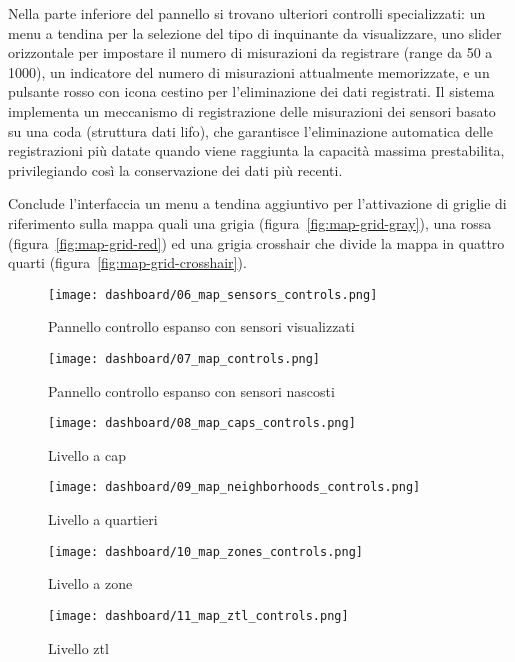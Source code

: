 Nella parte inferiore del pannello si trovano ulteriori controlli specializzati: un menu a tendina per la selezione
del tipo di inquinante da visualizzare, uno slider orizzontale per impostare il numero di misurazioni
da registrare (range da 50 a 1000), un indicatore del numero di misurazioni attualmente memorizzate, e un pulsante
rosso con icona cestino per l'eliminazione dei dati registrati. Il sistema implementa un meccanismo di registrazione
delle misurazioni dei sensori basato su una coda (struttura dati \acrshort{lifo}), che garantisce
l'eliminazione automatica delle registrazioni più datate quando viene raggiunta la capacità massima prestabilita,
privilegiando così la conservazione dei dati più recenti.

Conclude l'interfaccia un menu a tendina aggiuntivo per l'attivazione di griglie di riferimento sulla mappa
quali una grigia (figura~\ref{fig:map-grid-gray}), una rossa
(figura~\ref{fig:map-grid-red}) ed una grigia crosshair che divide la mappa
in quattro quarti (figura~\ref{fig:map-grid-crosshair}).

\begin{figure}[H]
  \centering
  \texttt{[image: dashboard/06\_map\_sensors\_controls.png]}
  \caption{Pannello controllo espanso con sensori visualizzati}
  \label{fig:map-layer-sensors}

  \hfill

  \texttt{[image: dashboard/07\_map\_controls.png]}
  \caption{Pannello controllo espanso con sensori nascosti}
  \label{fig:map-layer-clear}
\end{figure}

\newpage

\begin{figure}[H]
  \centering
  \texttt{[image: dashboard/08\_map\_caps\_controls.png]}
  \caption{Livello a \acrshort{cap}}
  \label{fig:map-layer-caps}

  \hfill

  \texttt{[image: dashboard/09\_map\_neighborhoods\_controls.png]}
  \caption{Livello a quartieri}
  \label{fig:map-layer-neighborhoods}
\end{figure}

\begin{figure}[H]
  \centering
  \texttt{[image: dashboard/10\_map\_zones\_controls.png]}
  \caption{Livello a zone}
  \label{fig:map-layer-zones}

  \hfill

  \texttt{[image: dashboard/11\_map\_ztl\_controls.png]}
  \caption{Livello \acrshort{ztl}}
  \label{fig:map-layer-ztl}
\end{figure}

